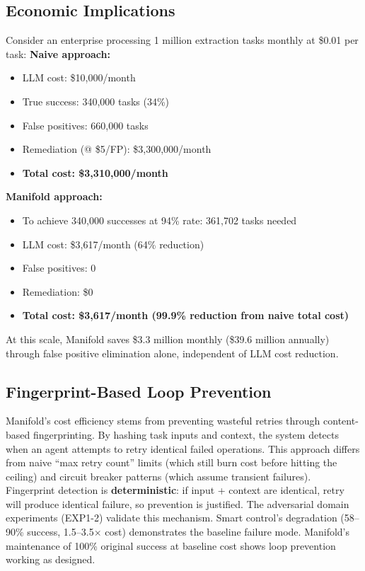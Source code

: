 \documentclass{article}
\begin{document}
\subsection{Economic Implications}
Consider an enterprise processing 1 million extraction tasks monthly at \$0.01 per task:
\textbf{Naive approach:}
\begin{itemize}
\item LLM cost: \$10,000/month
\item True success: 340,000 tasks (34\%)
\item False positives: 660,000 tasks
\item Remediation (@ \$5/FP): \$3,300,000/month
\item \textbf{Total cost: \$3,310,000/month}
\end{itemize}
\textbf{Manifold approach:}
\begin{itemize}
\item To achieve 340,000 successes at 94\% rate: 361,702 tasks needed
\item LLM cost: \$3,617/month (64\% reduction)
\item False positives: 0
\item Remediation: \$0
\item \textbf{Total cost: \$3,617/month (99.9\% reduction from naive total cost)}
\end{itemize}
At this scale, Manifold saves \$3.3 million monthly (\$39.6 million annually) through false positive elimination alone, independent of LLM cost reduction.

\subsection{Fingerprint-Based Loop Prevention}
Manifold's cost efficiency stems from preventing wasteful retries through content-based fingerprinting. By hashing task inputs and context, the system detects when an agent attempts to retry identical failed operations.
This approach differs from naive ``max retry count'' limits (which still burn cost before hitting the ceiling) and circuit breaker patterns (which assume transient failures). Fingerprint detection is \textbf{deterministic}: if input + context are identical, retry will produce identical failure, so prevention is justified.
The adversarial domain experiments (EXP1-2) validate this mechanism. Smart control's degradation (58--90\% success, 1.5--3.5$\times$ cost) demonstrates the baseline failure mode. Manifold's maintenance of 100\% original success at baseline cost shows loop prevention working as designed.
\end{document}
